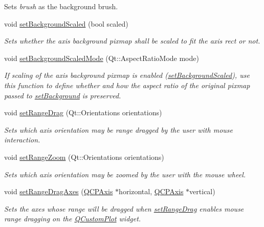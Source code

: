 \begin{DoxyCompactItemize}
\begin{DoxyCompactList}
Sets {\itshape brush} as the background brush. \end{DoxyCompactList}\item 
void \hyperlink{classQCPAxisRect_ae6d36c3e0e968ffb991170a018e7b503}{set\+Background\+Scaled} (bool scaled)
\begin{DoxyCompactList}\small\item\em Sets whether the axis background pixmap shall be scaled to fit the axis rect or not. \end{DoxyCompactList}\item 
void \hyperlink{classQCPAxisRect_a5ef77ea829c9de7ba248e473f48f7305}{set\+Background\+Scaled\+Mode} (Qt\+::\+Aspect\+Ratio\+Mode mode)
\begin{DoxyCompactList}\small\item\em If scaling of the axis background pixmap is enabled (\hyperlink{classQCPAxisRect_ae6d36c3e0e968ffb991170a018e7b503}{set\+Background\+Scaled}), use this function to define whether and how the aspect ratio of the original pixmap passed to \hyperlink{classQCPAxisRect_af615ab5e52b8e0a9a0eff415b6559db5}{set\+Background} is preserved. \end{DoxyCompactList}\item 
void \hyperlink{classQCPAxisRect_ae6aef2f7211ba6097c925dcd26008418}{set\+Range\+Drag} (Qt\+::\+Orientations orientations)
\begin{DoxyCompactList}\small\item\em Sets which axis orientation may be range dragged by the user with mouse interaction. \end{DoxyCompactList}\item 
void \hyperlink{classQCPAxisRect_a7960a9d222f1c31d558b064b60f86a31}{set\+Range\+Zoom} (Qt\+::\+Orientations orientations)
\begin{DoxyCompactList}\small\item\em Sets which axis orientation may be zoomed by the user with the mouse wheel. \end{DoxyCompactList}\item 
void \hyperlink{classQCPAxisRect_a648cce336bd99daac4a5ca3e5743775d}{set\+Range\+Drag\+Axes} (\hyperlink{classQCPAxis}{Q\+C\+P\+Axis} $\ast$horizontal, \hyperlink{classQCPAxis}{Q\+C\+P\+Axis} $\ast$vertical)
\begin{DoxyCompactList}\small\item\em Sets the axes whose range will be dragged when \hyperlink{classQCPAxisRect_ae6aef2f7211ba6097c925dcd26008418}{set\+Range\+Drag} enables mouse range dragging on the \hyperlink{classQCustomPlot}{Q\+Custom\+Plot} widget. \end{DoxyCompactList}\item 

\end{DoxyCompactItemize}
